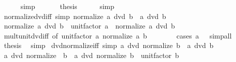 \begin{isabellebody}
\ \ \ \ \isamarkupfalse%
\ simp\isanewline
\ \ \isamarkupfalse%
\ {\isacharasterisk}{\kern0pt}\ \isamarkupfalse%
\ {\isacharquery}{\kern0pt}thesis\isanewline
\ \ \ \ \isamarkupfalse%
\ simp\isanewline
{}\isamarkupfalse%
%
\endisatagproof
{\isafoldproof}%
%
\isadelimproof
\isanewline
%
\endisadelimproof
\isanewline
{}\isamarkupfalse%
\ normalize{\isacharunderscore}{\kern0pt}dvd{\isacharunderscore}{\kern0pt}iff\ {\isacharbrackleft}{\kern0pt}simp{\isacharbrackright}{\kern0pt}{\isacharcolon}{\kern0pt}\ {\isachardoublequoteopen}normalize\ a\ dvd\ b\ {\isasymlongleftrightarrow}\ a\ dvd\ b{\isachardoublequoteclose}\isanewline
%
\isadelimproof
%
\endisadelimproof
%
\isatagproof
{}\isamarkupfalse%
\ {\isacharminus}{\kern0pt}\isanewline
\ \ \isamarkupfalse%
\ {\isachardoublequoteopen}normalize\ a\ dvd\ b\ {\isasymlongleftrightarrow}\ unit{\isacharunderscore}{\kern0pt}factor\ a\ {\isacharasterisk}{\kern0pt}\ normalize\ a\ dvd\ b{\isachardoublequoteclose}\isanewline
\ \ \ \ \isamarkupfalse%
\ mult{\isacharunderscore}{\kern0pt}unit{\isacharunderscore}{\kern0pt}dvd{\isacharunderscore}{\kern0pt}iff\ {\isacharbrackleft}{\kern0pt}of\ {\isachardoublequoteopen}unit{\isacharunderscore}{\kern0pt}factor\ a{\isachardoublequoteclose}\ {\isachardoublequoteopen}normalize\ a{\isachardoublequoteclose}\ b{\isacharbrackright}{\kern0pt}\isanewline
\ \ \ \ \ \ \isamarkupfalse%
\ {\isacharparenleft}{\kern0pt}cases\ {\isachardoublequoteopen}a\ {\isacharequal}{\kern0pt}\ {}{\isachardoublequoteclose}{\isacharparenright}{\kern0pt}\ simp{\isacharunderscore}{\kern0pt}all\isanewline
\ \ \isamarkupfalse%
\ \isamarkupfalse%
\ {\isacharquery}{\kern0pt}thesis\ \isamarkupfalse%
\ simp\isanewline
{}\isamarkupfalse%
%
\endisatagproof
{\isafoldproof}%
%
\isadelimproof
\isanewline
%
\endisadelimproof
\isanewline
{}\isamarkupfalse%
\ dvd{\isacharunderscore}{\kern0pt}normalize{\isacharunderscore}{\kern0pt}iff\ {\isacharbrackleft}{\kern0pt}simp{\isacharbrackright}{\kern0pt}{\isacharcolon}{\kern0pt}\ {\isachardoublequoteopen}a\ dvd\ normalize\ b\ {\isasymlongleftrightarrow}\ a\ dvd\ b{\isachardoublequoteclose}\isanewline
%
\isadelimproof
%
\endisadelimproof
%
\isatagproof
{}\isamarkupfalse%
\ {\isacharminus}{\kern0pt}\isanewline
\ \ \isamarkupfalse%
\ {\isachardoublequoteopen}a\ dvd\ normalize\ \ b\ {\isasymlongleftrightarrow}\ a\ dvd\ normalize\ b\ {\isacharasterisk}{\kern0pt}\ unit{\isacharunderscore}{\kern0pt}factor\ b{\isachardoublequoteclose}\isanewline

\end{isabellebody}
